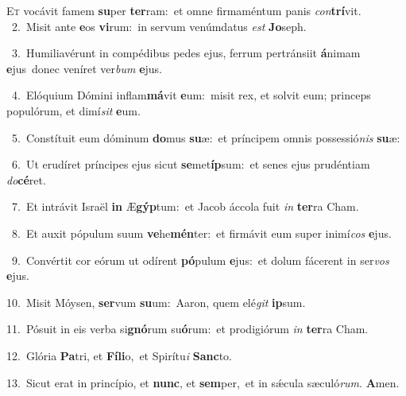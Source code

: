 \lettrine{\initial\textcolor{\initialcolor}{E}}{t} vocávit famem \textbf{su}\-per \textbf{ter}\-ram:~\star et omne firmaméntum panis \textit{con}\-\textbf{trí}vit.\\
{\numbfont\textcolor{\numbcolor}{~2.}}~Misit ante \textbf{e}\-os \textbf{vi}\-rum:~\star in servum venúmdatus \textit{est} \textbf{Jo}\-seph.\par
{\numbfont\textcolor{\numbcolor}{~3.}}~Humiliavérunt in compédibus pedes ejus, ferrum pertránsiit \textbf{á}\-nimam \textbf{e}\-jus~\star donec veníret ver\textit{bum} \textbf{e}\-jus.\par
{\numbfont\textcolor{\numbcolor}{~4.}}~Elóquium Dómini inflam\-\textbf{má}\-vit \textbf{e}\-um:~\star misit rex, et solvit eum; princeps populórum, et dimí\textit{sit} \textbf{e}\-um.\par
{\numbfont\textcolor{\numbcolor}{~5.}}~Constítuit eum dóminum \textbf{do}\-mus \textbf{su}\-æ:~\star et príncipem omnis possessió\textit{nis} \textbf{su}\-æ:\par
{\numbfont\textcolor{\numbcolor}{~6.}}~Ut erudíret príncipes ejus sicut \textbf{se}\-met\-\textbf{íp}\-sum:~\star et senes ejus prudéntiam \textit{do}\-\textbf{cé}ret.\par
{\numbfont\textcolor{\numbcolor}{~7.}}~Et intrávit Israël \textbf{in} Æ\-\textbf{gýp}\-tum:~\star et Jacob áccola fuit \textit{in} \textbf{ter}\-ra Cham.\par
{\numbfont\textcolor{\numbcolor}{~8.}}~Et auxit pópulum suum \textbf{ve}\-he\-\textbf{mén}\-ter:~\star et firmávit eum super inimí\textit{cos} \textbf{e}\-jus.\par
{\numbfont\textcolor{\numbcolor}{~9.}}~Convértit cor eórum ut odírent \textbf{pó}\-pulum \textbf{e}\-jus:~\star et dolum fácerent in ser\textit{vos} \textbf{e}\-jus.\par
{\numbfont\textcolor{\numbcolor}{10.}}~Misit Móysen, \textbf{ser}\-vum \textbf{su}\-um:~\star Aaron, quem elé\textit{git} \textbf{ip}\-sum.\par
{\numbfont\textcolor{\numbcolor}{11.}}~Pósuit in eis verba si\-\textbf{gnó}\-rum su\-\textbf{ó}\-rum:~\star et prodigiórum \textit{in} \textbf{ter}\-ra Cham.\par
{\numbfont\textcolor{\numbcolor}{12.}}~Glória \textbf{Pa}\-tri, et \textbf{Fí}\-\textbf{li}o,~\star et Spirítu\textit{i} \textbf{Sanc}\-to.\par
{\numbfont\textcolor{\numbcolor}{13.}}~Sicut erat in princípio, et \textbf{nunc}\-, et \textbf{sem}\-per,~\star et in sǽcula sæculó\-\textit{rum}\-. \textbf{A}\-men.\par
